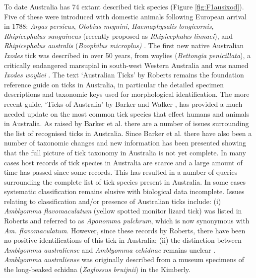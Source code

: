 \documentclass[a4paper, nobind]{templates/ociamthesis}
\begin{document}
To date Australia has 74 extant described tick species (Figure \ref{fig:F1ausixod}).
Five of these were introduced with domestic animals following European arrival in 1788: \emph{Argas persicus}, \emph{Otobius megnini}, \emph{Haemaphysalis longicornis}, \emph{Rhipicephalus sanguineus} (recently proposed as \emph{Rhipicephalus linnaei}), and \emph{Rhipicephalus australis} (\emph{Boophilus microplus)} \autocite{barkerTicksAustraliaSpecies2014}.
The first new native Australian \emph{Ixodes} tick was described in over 50 years, from woylies (\emph{Bettongia penicillata}), a critically endangered marsupial in south-west Western Australia and was named \emph{Ixodes woyliei} \autocite{ashMorphologicalMolecularDescription2017}.
The text `Australian Ticks' by Roberts \autocite*{robertsAustralianTicks1970} remains the foundation reference guide on ticks in Australia, in particular the detailed specimen descriptions and taxonomic keys used for morphological identification.
The more recent guide, `Ticks of Australia' by Barker and Walker \autocite*{barkerTicksAustraliaSpecies2014}, has provided a much needed update on the most common tick species that effect humans and animals in Australia.
As raised by Barker et al. \autocite*{barkerList70Species2014} there are a number of issues surrounding the list of recognised ticks in Australia.
Since Barker et al. \autocite*{barkerList70Species2014} there have also been a number of taxonomic changes and new information has been presented showing that the full picture of tick taxonomy in Australia is not yet complete.
In many cases host records of tick species in Australia are scarce and a large amount of time has passed since some records.
This has resulted in a number of queries surrounding the complete list of tick species present in Australia.
In some cases systematic classification remains elusive with biological data incomplete.
Issues relating to classification and/or presence of Australian ticks include:
(i) \emph{Amblyomma flavomaculatum} (yellow spotted monitor lizard tick) was listed in Roberts \autocite*{robertsAustralianSpeciesAponomma1953,robertsFurtherObservationsAustralian1964,robertsAustralianTicks1970} and referred to as \emph{Aponomma pulchrum}, which is now synonymous with \emph{Am. flavomaculatum}.
However, since these records by Roberts, there have been no positive identifications of this tick in Australia;
(ii) the distinction between \emph{Amblyomma australiense} and \emph{Amblyomma echidnae} remains unclear \autocite{guglielmoneCommentsControversialTick2009}. \emph{Amblyomma australiense} was originally described from a museum specimens of the long-beaked echidna (\emph{Zaglossus bruijnii}) in the Kimberly.
\end{document}
